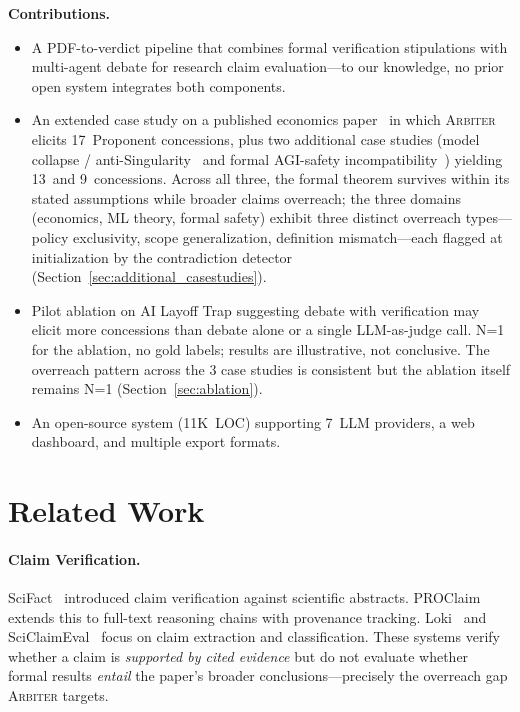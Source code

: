 \documentclass[11pt]{article}
\newcommand{\arbiter}{\textsc{Arbiter}}
\begin{document}
\noindent\textbf{Contributions.}
\begin{itemize}[leftmargin=*,itemsep=2pt]
\item A PDF-to-verdict pipeline that combines formal verification stipulations with multi-agent debate for research claim evaluation---to our knowledge, no prior open system integrates both components.
\item An extended case study on a published economics paper~\cite{falk2026} in which \arbiter{} elicits 17~Proponent concessions, plus two additional case studies (model collapse / anti-Singularity~\cite{selfimprovement2026} and formal AGI-safety incompatibility~\cite{agisafety2026}) yielding 13~and 9~concessions. Across all three, the formal theorem survives within its stated assumptions while broader claims overreach; the three domains (economics, ML theory, formal safety) exhibit three distinct overreach types---policy exclusivity, scope generalization, definition mismatch---each flagged at initialization by the contradiction detector (Section~\ref{sec:additional_casestudies}).
\item Pilot ablation on AI Layoff Trap suggesting debate with verification may elicit more concessions than debate alone or a single LLM-as-judge call. N=1 for the ablation, no gold labels; results are illustrative, not conclusive. The overreach pattern across the 3 case studies is consistent but the ablation itself remains N=1 (Section~\ref{sec:ablation}).
\item An open-source system (11K~LOC) supporting 7~LLM providers, a web dashboard, and multiple export formats.
\end{itemize}


\section{Related Work}
\label{sec:related}

\paragraph{Claim Verification.}
SciFact~\cite{wadden2020} introduced claim verification against scientific abstracts.
PROClaim~\cite{proclaim2026} extends this to full-text reasoning chains with provenance tracking.
Loki~\cite{loki2024} and SciClaimEval~\cite{sciclaimeval2024} focus on claim extraction and classification.
These systems verify whether a claim is \emph{supported by cited evidence} but do not evaluate whether formal results \emph{entail} the paper's broader conclusions---precisely the overreach gap \arbiter{} targets.
\end{document}
